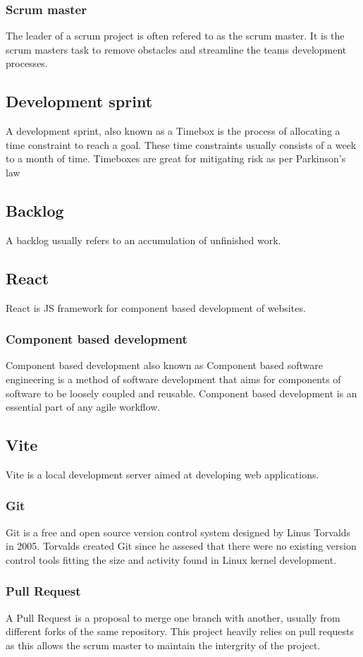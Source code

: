 \documentclass[12pt]{article}
\begin{document}
\subsubsection{Scrum master}
The leader of a scrum project is often refered to as the scrum master.
It is the scrum masters task to remove obstacles and streamline the teams development processes.
\subsection{Development sprint\cite{Timeboxing2024}}
A development sprint, also known as a Timebox is the process of allocating a time constraint to
reach a goal. These time constraints usually consists of a week to a month of time.
Timeboxes are great for mitigating risk as per Parkinson's law\cite{ParkinsonLaw2024}
\subsection{Backlog\cite{Backlog2022}}
A backlog usually refers to an accumulation of unfinished work.
\subsection{React\cite{React}}
React is JS\cite{ECMA262} framework for component based development of websites.
\subsubsection{Component based development\cite*{ComponentbasedSoftwareEngineering2024}}
Component based development also known as Component based software engineering is a method of software development
that aims for components of software to be loosely coupled and reusable. Component based development is an 
essential part of any agile workflow.
\subsection{Vite\cite{Vite}}
Vite is a local development server aimed at developing web applications.
\subsubsection*{Git\cite*{Git}}
Git is a free and open source version control system designed by Linus Torvalds in 2005. Torvalds
created Git since he assesed that there were no existing version control tools fitting the size and activity found in Linux kernel development.
\subsubsection{Pull Request\cite{PullRequests}}
A Pull Request is a proposal to merge one branch with another, usually from different forks of the same repository.
This project heavily relies on pull requests as this allows the scrum master to maintain the intergrity of the project.
\end{document}
